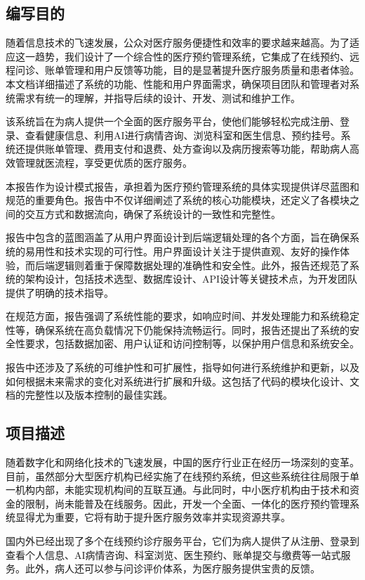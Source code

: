 \subsection{编写目的}
随着信息技术的飞速发展，公众对医疗服务便捷性和效率的要求越来越高。为了适应这一趋势，我们设计了一个综合性的医疗预约管理系统，它集成了在线预约、远程问诊、账单管理和用户反馈等功能，目的是显著提升医疗服务质量和患者体验。本文档详细描述了系统的功能、性能和用户界面需求，确保项目团队和管理者对系统需求有统一的理解，并指导后续的设计、开发、测试和维护工作。

该系统旨在为病人提供一个全面的医疗服务平台，使他们能够轻松完成注册、登录、查看健康信息、利用AI进行病情咨询、浏览科室和医生信息、预约挂号。系统还提供账单管理、费用支付和退费、处方查询以及病历搜索等功能，帮助病人高效管理就医流程，享受更优质的医疗服务。


本报告作为设计模式报告，承担着为医疗预约管理系统的具体实现提供详尽蓝图和规范的重要角色。报告中不仅详细阐述了系统的核心功能模块，还定义了各模块之间的交互方式和数据流向，确保了系统设计的一致性和完整性。

报告中包含的蓝图涵盖了从用户界面设计到后端逻辑处理的各个方面，旨在确保系统的易用性和技术实现的可行性。用户界面设计关注于提供直观、友好的操作体验，而后端逻辑则着重于保障数据处理的准确性和安全性。此外，报告还规范了系统的架构设计，包括技术选型、数据库设计、API设计等关键技术点，为开发团队提供了明确的技术指导。

在规范方面，报告强调了系统性能的要求，如响应时间、并发处理能力和系统稳定性等，确保系统在高负载情况下仍能保持流畅运行。同时，报告还提出了系统的安全性要求，包括数据加密、用户认证和访问控制等，以保护用户信息和系统安全。

报告中还涉及了系统的可维护性和可扩展性，指导如何进行系统维护和更新，以及如何根据未来需求的变化对系统进行扩展和升级。这包括了代码的模块化设计、文档的完整性以及版本控制的最佳实践。

\subsection{项目描述}
随着数字化和网络化技术的飞速发展，中国的医疗行业正在经历一场深刻的变革。目前，虽然部分大型医疗机构已经实施了在线预约系统，但这些系统往往局限于单一机构内部，未能实现机构间的互联互通。与此同时，中小医疗机构由于技术和资金的限制，尚未能普及在线服务。因此，开发一个全面、一体化的医疗预约管理系统显得尤为重要，它将有助于提升医疗服务效率并实现资源共享。

国内外已经出现了多个在线预约诊疗服务平台，它们为病人提供了从注册、登录到查看个人信息、AI病情咨询、科室浏览、医生预约、账单提交与缴费等一站式服务。此外，病人还可以参与问诊评价体系，为医疗服务提供宝贵的反馈。

